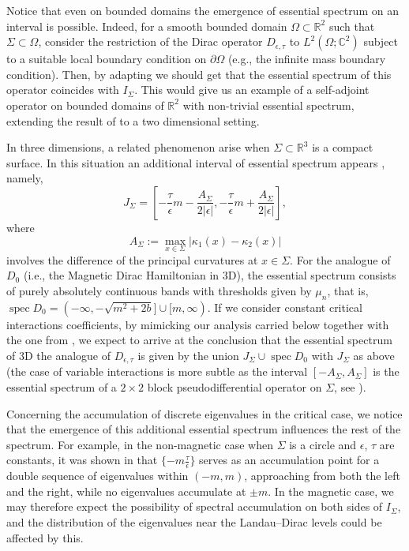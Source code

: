 \documentclass[11pt,a4paper,reqno,oneside]{amsproc}
\DeclareMathOperator{\spec}{spec}
\def \rr {{\mathbb R}}
\def \cc {{\mathbb C}}
\numberwithin{equation}{section}
\def \cc {{\mathbb{C}}}
\begin{document}
Notice that even on bounded domains the emergence of essential spectrum on an interval is possible.  Indeed, for a  smooth bounded domain $\Omega\subset\rr^2$ such that $\Sigma\subset\Omega$, consider the restriction of  the Dirac operator $D_{\epsilon,\tau}$  to $L^2(\Omega;\cc^2)$  subject to a  suitable local  boundary condition on $\partial \Omega$ (e.g., the infinite mass boundary condition).  Then, by  adapting \cite{BBHP} we should get that the essential spectrum of this operator coincides with $I_\Sigma$. This would give us an example of a self-adjoint operator on bounded domains of $\rr^2$  with  non-trivial essential spectrum, extending the result of  \cite{BBHP} to a two dimensional setting.    


In three dimensions, a related phenomenon arise when $\Sigma\subset\rr^3$ is a compact surface. In this situation an additional interval of essential spectrum  appears \cite{BP24}, namely, 
\begin{equation*}
 J_\Sigma= \left[-\frac{\tau}{\epsilon}m -\frac{ A_\Sigma}{2|\epsilon|},-\frac{\tau}{\epsilon}m   +\dfrac{ A_\Sigma}{2|\epsilon|}\right],
\end{equation*}
where 
\[
A_\Sigma:=\max_{x\in\Sigma}\big|\kappa_1(x)-\kappa_2(x)\big|
\]
involves the difference of the principal curvatures  at $x\in\Sigma$. For the analogue of $D_0$ (i.e., the Magnetic Dirac Hamiltonian in 3D), the essential spectrum consists of purely absolutely continuous bands with thresholds given by $\mu_n$,  that is, $\spec D_0= (-\infty,-\sqrt{m^2+2b}]\cup [m,\infty)$.  If we consider constant critical interactions coefficients, by  mimicking our analysis carried below together with the one from \cite{BP24}, we expect to arrive at the conclusion that the essential spectrum of 3D the analogue of  $D_{\epsilon,\tau}$ is given by the union $J_\Sigma \cup \spec D_0 $  with $J_\Sigma$ as above  (the case of variable interactions is more subtle as the interval $[-A_\Sigma, A_\Sigma]$ is the essential spectrum of a $2\times2$ block pseudodifferential operator on $\Sigma$, see \cite[pages 250-251]{BP24}). 


 Concerning the accumulation of discrete eigenvalues in the critical case, we notice that the emergence of this additional essential spectrum influences the rest of the spectrum. For example, in the non-magnetic case when $\Sigma$ is a circle and $\epsilon$, $\tau$ are constants, it was shown in  \cite{BCF} that  $\{-m\frac{\tau}{\epsilon}\}$ serves as an accumulation point for a double sequence of eigenvalues within $(-m,m)$, approaching from both the left and the right, while no eigenvalues accumulate at $\pm m$. In the magnetic case, we may therefore expect the possibility of spectral accumulation on both sides of $I_\Sigma$, and the distribution of the eigenvalues near the Landau--Dirac levels could be affected by this.
\end{document}
